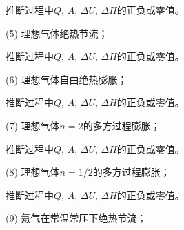 \documentclass[CJK]{beamer}
\begin{document}
\begin{frame}
\bch


推断过程中$Q$, $A$, $\Delta U$, $\Delta H$的正负或零值。

\bitem
\item[(5)]{理想气体绝热节流；}
\eitem

\ech
\end{frame}

\begin{frame}
\bch


推断过程中$Q$, $A$, $\Delta U$, $\Delta H$的正负或零值。

\bitem
\item[(6)]{理想气体自由绝热膨胀；}
\eitem

\ech
\end{frame}


\begin{frame}
\bch


推断过程中$Q$, $A$, $\Delta U$, $\Delta H$的正负或零值。

\bitem
\item[(7)]{理想气体$n=2$的多方过程膨胀；}
\eitem

\ech
\end{frame}

\begin{frame}
\bch


推断过程中$Q$, $A$, $\Delta U$, $\Delta H$的正负或零值。

\bitem
\item[(8)]{理想气体$n=1/2$的多方过程膨胀；}
\eitem

\ech
\end{frame}

\begin{frame}
\bch


推断过程中$Q$, $A$, $\Delta U$, $\Delta H$的正负或零值。

\bitem
\item[(9)]{氦气在常温常压下绝热节流；}
\eitem

\ech
\end{frame}
\end{document}
